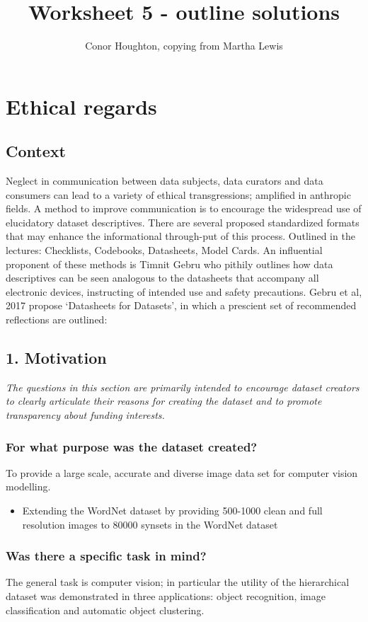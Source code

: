 \documentclass[a4paper,12pt]{article}
\title{Worksheet 5 - outline solutions}
\author{Conor Houghton, copying from Martha Lewis}
\date{}
\begin{document}
\maketitle

\section*{Ethical regards}

\subsection*{Context}
Neglect in communication between data subjects, data curators and data consumers can lead to a
variety of ethical transgressions; amplified in anthropic fields. A method to improve communication
is to encourage the widespread use of elucidatory dataset descriptives. There are several proposed
standardized formats that may enhance the informational through-put of this process. Outlined in
the lectures: Checklists, Codebooks, Datasheets, Model Cards. An influential proponent of these
methods is Timnit Gebru who pithily outlines how data descriptives can be seen analogous to the
datasheets that accompany all electronic devices, instructing of intended use and safety precautions.
Gebru et al, 2017 propose `Datasheets for Datasets’, in which a prescient set of recommended
reflections are outlined:

\subsection*{1. Motivation}

\textsl{The questions in this section are primarily intended to encourage dataset
creators to clearly articulate their reasons for creating the dataset and to promote
transparency about funding interests.}

\subsubsection*{For what purpose was the dataset created?}
To provide a large scale, accurate and diverse image data set for computer vision modelling.
\begin{itemize}
\item Extending the WordNet dataset by providing 500-1000 clean and full resolution images to
80000 synsets in the WordNet dataset
\end{itemize}

\subsubsection*{Was there a specific task in mind?}
The general task is computer vision; in particular the utility of the hierarchical dataset was
demonstrated in three applications: object recognition, image classification and automatic object
clustering.
\end{document}
